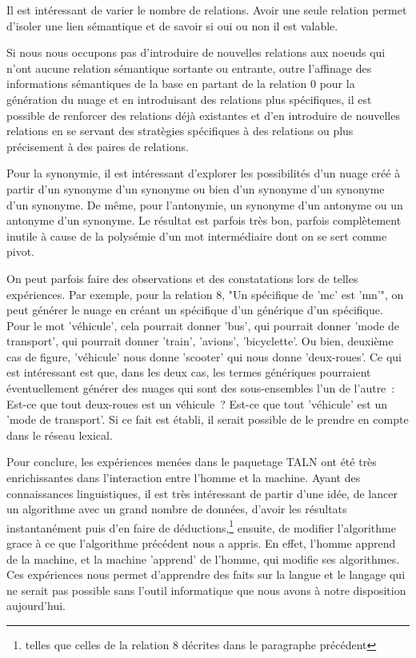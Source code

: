 \documentclass[a4paper,11pt,french]{article}
\begin{document}
Il est intéressant de varier le nombre de relations. Avoir une seule relation permet d'isoler une lien sémantique et de savoir si oui ou non il est valable. 
 
Si nous nous occupons pas d'introduire de nouvelles relations aux noeuds qui n'ont aucune relation sémantique sortante ou entrante, outre l'affinage des informations sémantiques de la base en partant de la relation 0 pour la génération du nuage et en introduisant des relations plus spécifiques, il est possible de renforcer des relations déjà existantes et d'en introduire de nouvelles relations en se servant des stratègies spécifiques à des relations ou plus précisement à des paires de relations.

Pour la synonymie, il est intéressant d'explorer les possibilités d'un nuage créé à partir d'un synonyme d'un synonyme ou bien d'un synonyme d'un synonyme d'un synonyme. De même, pour l'antonymie, un synonyme d'un antonyme ou un antonyme d'un synonyme. Le résultat est parfois très bon, parfois complètement inutile à cause de la polysémie d'un mot intermédiaire dont on se sert comme pivot.

On peut parfois faire des observations et des constatations lors de telles expériences. Par exemple, pour la relation 8, "Un spécifique de 'mc' est 'mn'", on peut générer le nuage en créant un spécifique d'un générique d'un spécifique. Pour le mot 'véhicule', cela pourrait donner 'bus', qui pourrait donner 'mode de transport', qui pourrait donner 'train', 'avions', 'bicyclette'. Ou bien, deuxième cas de figure, 'véhicule' nous donne 'scooter' qui nous donne 'deux-roues'. Ce qui est intéressant est que, dans les deux cas, les termes génériques pourraient éventuellement générer des nuages qui sont des sous-ensembles l'un de l'autre~: Est-ce que tout deux-roues est un véhicule~? Est-ce que tout 'véhicule' est un 'mode de transport'. Si ce fait est établi, il serait possible de le prendre en compte dans le réseau lexical. 

Pour conclure, les expériences menées dans le paquetage TALN ont été très enrichissantes dans l'interaction entre l'homme et la machine. Ayant des connaissances linguistiques, il est très intéressant de partir d'une idée, de lancer un algorithme avec un grand nombre de données, d'avoir les résultats instantanément puis d'en faire de déductions,\footnote{telles que celles de la relation 8 décrites dans le paragraphe précédent} ensuite, de modifier l'algorithme grace à ce que l'algorithme précédent nous a appris. En effet, l'homme apprend de la machine, et la machine 'apprend' de l'homme, qui modifie ses algorithmes. Ces expériences nous permet d'apprendre des faits sur la langue et le langage qui ne serait pas possible sans l'outil informatique que nous avons à notre disposition aujourd'hui.  
\end{document}
